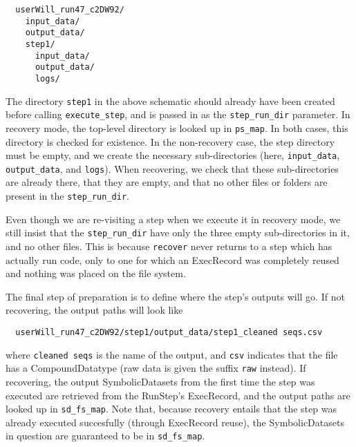 \documentclass[12pt]{article}
\newcommand{\code}[1]{\texttt{#1}}
\begin{document}
\begin{verbatim}
  userWill_run47_c2DW92/
    input_data/
    output_data/
    step1/
      input_data/
      output_data/
      logs/
\end{verbatim}

The directory \code{step1} in the above schematic should already have been
created before calling \code{execute\_step}, and is passed in as the
\code{step\_run\_dir} parameter. In recovery mode, the top-level directory is
looked up in \code{ps\_map}. In both cases, this directory is checked for
existence. In the non-recovery case, the step directory must be empty, and we
create the necessary sub-directories (here, \code{input\_data},
\code{output\_data}, and \code{logs}). When recovering, we check that these
sub-directories are already there, that they are empty, and that no other files
or folders are present in the \code{step\_run\_dir}.

Even though we are re-visiting a step when we execute it in recovery mode, we
still insist that the \code{step\_run\_dir} have only the three empty
sub-directories in it, and no other files. This is because \code{recover}
never returns to a step which has actually run code, only to one for which an
ExecRecord was completely reused and nothing was placed on the file system.

The final step of preparation is to define where the step's outputs will go. If 
not recovering, the output paths will look like

\begin{verbatim}
  userWill_run47_c2DW92/step1/output_data/step1_cleaned seqs.csv
\end{verbatim}

where \code{cleaned seqs} is the name of the output, and \code{csv} indicates
that the file has a CompoundDatatype (raw data is given the suffix \code{raw}
instead). If recovering, the output SymbolicDatasets from the first time the
step was executed are retrieved from the RunStep's ExecRecord, and the output
paths are looked up in \code{sd\_fs\_map}. Note that, because recovery entails
that the step was already executed succesfully (through ExecRecord reuse), the
SymbolicDatasets in question are guaranteed to be in \code{sd\_fs\_map}.
\end{document}
